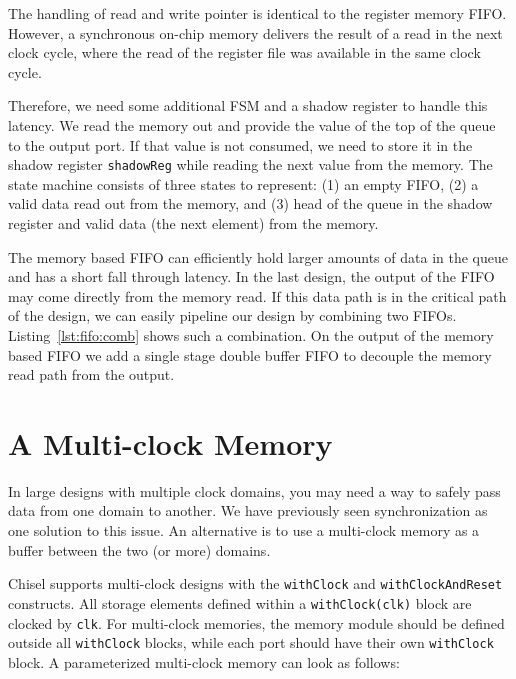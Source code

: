 \documentclass[%
    10pt,
    headinclude, footexclude,
    openright, %
    notitlepage,
    cleardoubleempty,
    headsepline,
    pointlessnumbers,
    bibtotoc, idxtotoc,
    ]{scrbook}
\newcommand{\code}[1]{{\small{\texttt{#1}}}}
\begin{document}

The handling of read and write pointer is identical to the register memory
FIFO. However, a synchronous on-chip memory delivers the result of a read
in the next clock cycle, where the read of the register file was available in the
same clock cycle.

Therefore, we need some additional FSM and a shadow register to handle
this latency. We read the memory out and provide the value of the top of the queue
to the output port. If that value is not consumed, we need to store it in the
shadow register \code{shadowReg} while reading the next value from the memory.
The state machine consists of three states to represent: (1) an empty FIFO, (2) a valid
data read out from the memory, and (3) head of the queue in the shadow register and
valid data (the next element) from the memory.

The memory based FIFO can efficiently hold larger amounts of data in the queue
and has a short fall through latency. In the last design, the output of the FIFO may
come directly from the memory read. If this data path is in the critical path of the design,
we can easily pipeline our design by combining two FIFOs. Listing~\ref{lst:fifo:comb}
shows such a combination. On the output of the memory based FIFO we add a single
stage double buffer FIFO to decouple the memory read path from the output.


\section{A Multi-clock Memory}

In large designs with multiple clock domains, you may need a way to safely 
pass data from one domain to another. We have previously seen synchronization as 
one solution to this issue. An alternative is to use a multi-clock memory as 
a buffer between the two (or more) domains. 

Chisel supports multi-clock designs with the \code{withClock} and 
\code{withClockAndReset} constructs. All storage elements defined within a 
\code{withClock(clk)} block are clocked by \code{clk}. For multi-clock memories, 
the memory module should be defined outside all \code{withClock} blocks, while 
each port should have their own \code{withClock} block. A parameterized 
multi-clock memory can look as follows:
\end{document}

